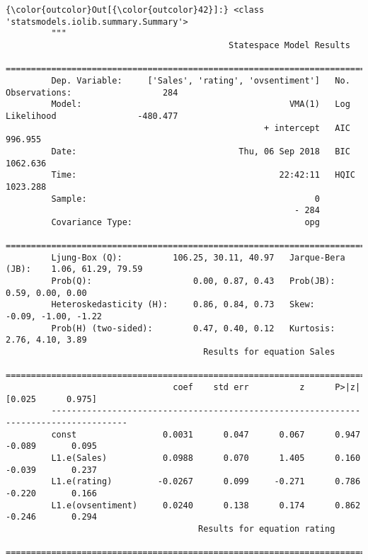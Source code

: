 \documentclass[11pt]{article}
\begin{document}
\begin{Verbatim}[commandchars=\\\{\}]
{\color{outcolor}Out[{\color{outcolor}42}]:} <class 'statsmodels.iolib.summary.Summary'>
         """
                                            Statespace Model Results                                   
         ==============================================================================================
         Dep. Variable:     ['Sales', 'rating', 'ovsentiment']   No. Observations:                  284
         Model:                                         VMA(1)   Log Likelihood                -480.477
                                                   + intercept   AIC                            996.955
         Date:                                Thu, 06 Sep 2018   BIC                           1062.636
         Time:                                        22:42:11   HQIC                          1023.288
         Sample:                                             0                                         
                                                         - 284                                         
         Covariance Type:                                  opg                                         
         ======================================================================================
         Ljung-Box (Q):          106.25, 30.11, 40.97   Jarque-Bera (JB):    1.06, 61.29, 79.59
         Prob(Q):                    0.00, 0.87, 0.43   Prob(JB):              0.59, 0.00, 0.00
         Heteroskedasticity (H):     0.86, 0.84, 0.73   Skew:               -0.09, -1.00, -1.22
         Prob(H) (two-sided):        0.47, 0.40, 0.12   Kurtosis:              2.76, 4.10, 3.89
                                       Results for equation Sales                             
         =====================================================================================
                                 coef    std err          z      P>|z|      [0.025      0.975]
         -------------------------------------------------------------------------------------
         const                 0.0031      0.047      0.067      0.947      -0.089       0.095
         L1.e(Sales)           0.0988      0.070      1.405      0.160      -0.039       0.237
         L1.e(rating)         -0.0267      0.099     -0.271      0.786      -0.220       0.166
         L1.e(ovsentiment)     0.0240      0.138      0.174      0.862      -0.246       0.294
                                      Results for equation rating                             
         =====================================================================================

\end{Verbatim}
\end{document}
